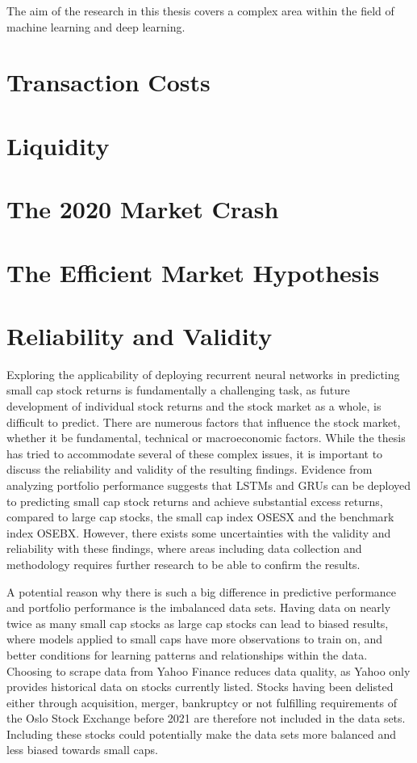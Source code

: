 The aim of the research in this thesis covers a complex area within the field of machine learning and deep learning.    

\section{Transaction Costs}

\section{Liquidity}

\section{The 2020 Market Crash}

\section{The Efficient Market Hypothesis}

\section{Reliability and Validity}
Exploring the applicability of deploying recurrent neural networks in predicting small cap stock returns is fundamentally a challenging task, as future development of individual stock returns and the stock market as a whole, is difficult to predict. There are numerous factors that influence the stock market, whether it be fundamental, technical or macroeconomic factors. While the thesis has tried to accommodate several of these complex issues, it is important to discuss the reliability and validity of the resulting findings. Evidence from analyzing portfolio performance suggests that LSTMs and GRUs can be deployed to predicting small cap stock returns and achieve substantial excess returns, compared to large cap stocks, the small cap index OSESX and the benchmark index OSEBX. However, there exists some uncertainties with the validity and reliability with these findings, where areas including data collection and methodology requires further research to be able to confirm the results. 

\indent\newline
A potential reason why there is such a big difference in predictive performance and portfolio performance is the imbalanced data sets. Having data on nearly twice as many small cap stocks as large cap stocks can lead to biased results, where models applied to small caps have more observations to train on, and better conditions for learning patterns and relationships within the data. Choosing to scrape data from Yahoo Finance reduces data quality, as Yahoo only provides historical data on stocks currently listed. Stocks having been delisted either through acquisition, merger, bankruptcy or not fulfilling requirements of the Oslo Stock Exchange before 2021 are therefore not included in the data sets. Including these stocks could potentially make the data sets more balanced and less biased towards small caps.     

